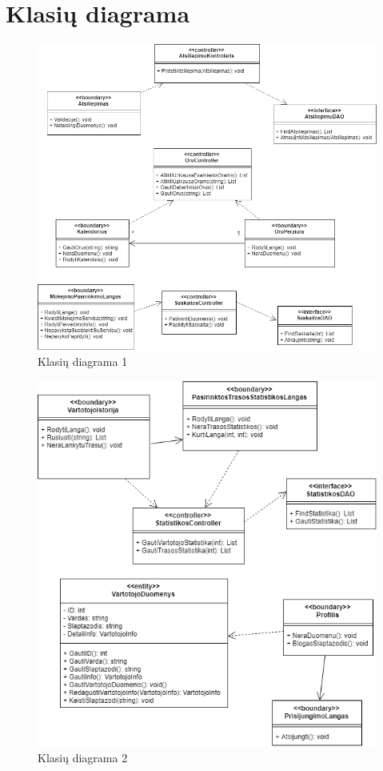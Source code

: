 \documentclass[oneside]{VUMIFPSkursinis}
\begin{document}
\section{Klasių diagrama}

			\begin{figure}[h]
    				\centering
    				\includegraphics[width=1\textwidth]{classA.png}
    				\caption{Klasių diagrama 1}
    				\label{fig:KlasiuDiagrama}
			\end{figure}
			\begin{figure}[h]
    				\centering
    				\includegraphics[width=1\textwidth]{classB.png}
    				\caption{Klasių diagrama 2}
    				\label{fig:KlasiuDiagrama}
			\end{figure}
\end{document}
